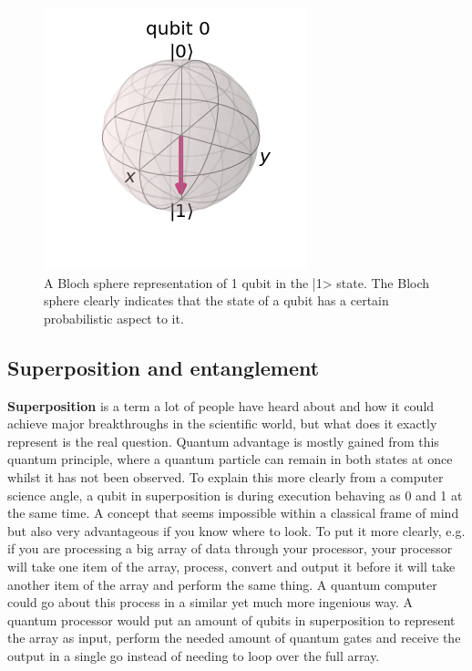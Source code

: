 \begin{figure}[h]
\centering
\includegraphics[scale = 0.75]{../Demonstration/img/Quantum_essentials_1.PNG}
\caption{A Bloch sphere representation of 1 qubit in the |1> state. The Bloch sphere clearly indicates that the state of a qubit has a certain probabilistic aspect to it.}
\end{figure}

\subsection{Superposition and entanglement}

\textbf{Superposition} is a term a lot of people have heard about and how it could achieve major breakthroughs in the scientific world, but what does it exactly represent is the real question. Quantum advantage is mostly gained from this quantum principle, where a quantum particle can remain in both states at once whilst it has not been observed. To explain this more clearly from a computer science angle, a qubit in superposition is during execution behaving as 0 and 1 at the same time. A concept that seems impossible within a classical frame of mind but also very advantageous if you know where to look. To put it more clearly, e.g. if you are processing a big array of data through your processor, your processor will take one item of the array, process, convert and output it before it will take another item of the array and perform the same thing. A quantum computer could go about this process in a similar yet much more ingenious way. A quantum processor would put an amount of qubits in superposition to represent the array as input, perform the needed amount of quantum gates and receive the output in a single go instead of needing to loop over the full array. ~\autocite{Draper2000}

